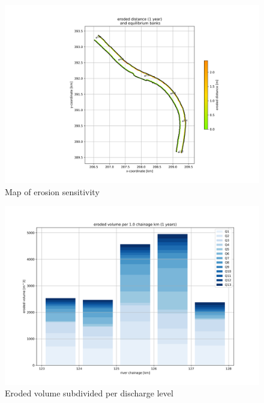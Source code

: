 \begin{figure}
\includegraphics[width=\textwidth]{figures/2_erosion_sensitivity.png}
\caption{Map of erosion sensitivity}
\label{Fig2.5}
\end{figure}

\begin{figure}
\includegraphics[width=\textwidth]{figures/3_eroded_volume_per_discharge.png}
\caption{Eroded volume subdivided per discharge level}
\label{Fig2.6a}
\end{figure}

